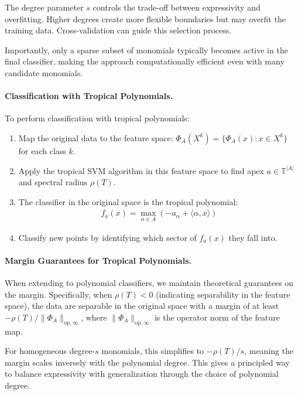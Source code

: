 \documentclass{article}
\newcommand{\trop}{\mathbb{T}}
\begin{document}
The degree parameter $s$ controls the trade-off between expressivity and overfitting. Higher degrees create more flexible boundaries but may overfit the training data. Cross-validation can guide this selection process.

Importantly, only a sparse subset of monomials typically becomes active in the final classifier, making the approach computationally efficient even with many candidate monomials.

\paragraph{Classification with Tropical Polynomials.}\label{subsec:poly_classification}
To perform classification with tropical polynomials:

\begin{enumerate}
    \item Map the original data to the feature space: $\Phi_A(X^k) = \{\Phi_A(x) : x \in X^k\}$ for each class $k$.
    
    \item Apply the tropical SVM algorithm in this feature space to find apex $a \in \trop^{|A|}$ and spectral radius $\rho(T)$.
    
    \item The classifier in the original space is the tropical polynomial:
    \begin{align}
    f_a(x) = \max_{\alpha \in A} (-a_\alpha + \langle \alpha, x \rangle)
    \end{align}
    
    \item Classify new points by identifying which sector of $f_a(x)$ they fall into.
\end{enumerate}

\paragraph{Margin Guarantees for Tropical Polynomials.}
When extending to polynomial classifiers, we maintain theoretical guarantees on the margin. Specifically, when $\rho(T)<0$ (indicating separability in the feature space), the data are separable in the original space with a margin of at least $-\rho(T)/\lVert \Phi_A\rVert_{\text{op},\infty}$, where $\lVert \Phi_A\rVert_{\text{op},\infty}$ is the operator norm of the feature map.

For homogeneous degree-$s$ monomials, this simplifies to $-\rho(T)/s$, meaning the margin scales inversely with the polynomial degree. This gives a principled way to balance expressivity with generalization through the choice of polynomial degree.
\end{document}
